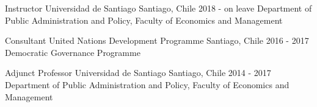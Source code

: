 





\begin{cventries}
\cventry
{Instructor} 
{Universidad de Santiago} 
{Santiago, Chile} 
{2018 - on leave}
{Department of Public Administration and Policy, Faculty of Economics and Management}\vspace{1.5mm}

\cventry
{Consultant} 
{United Nations Development Programme} 
{Santiago, Chile} 
{2016 - 2017}
{Democratic Governance Programme} \vspace{1.5mm}

\cventry
{Adjunct Professor} 
{Universidad de Santiago} 
{Santiago, Chile} 
{2014 - 2017}
{Department of Public Administration and Policy, Faculty of Economics and Management} \vspace{1.5mm}

\end{cventries}
